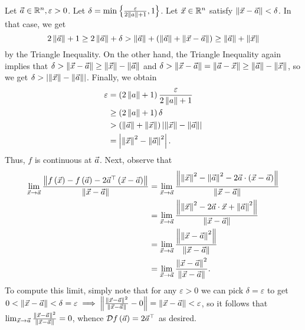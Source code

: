 \documentclass[main.tex]{subfiles}
\begin{document}
\begin{soln}
    Let $\va\in \RR^n, \varepsilon > 0$. Let $\delta = \min\braces{\frac{\varepsilon}{2\norm{a} + 1}, 1}$. Let $\vx\in \RR^n$ satisfy $\norm{\vx -\va} < \delta$. In that case, we get
    \[2\norm{\va} + 1 \ge 2\norm{\va} + \delta > \norm{\va} + \parens{\norm{\va} + \norm{\vx - \va}} \ge \norm{\va} + \norm{\vx}\]
    by the Triangle Inequality. On the other hand, the Triangle Inequality again implies that $\delta > \norm{\vx - \va} \ge \norm{\vx} - \norm{\va}$ and $\delta > \norm{\vx - \va} = \norm{\va - \vx} \ge \norm{\va} - \norm{\vx}$, so we get $\delta > \abs{\norm{\vx} - \norm{\va}}$. Finally, we obtain
    \begin{align*}
        \varepsilon &= \parens{2\norm{a} + 1}\frac{\varepsilon}{2\norm{a} + 1} \\
        &\ge \parens{2\norm{a} + 1}\delta \\
        &> \parens{\norm{\va} + \norm{\vx}}\abs{\norm{\vx} - \norm{\va}} \\
        &= \abs{\norm{\vx}^2 - \norm{\va}^2}.
    \end{align*}
    Thus, $f$ is continuous at $\va$.  Next, observe that
    \begin{align*}
        \limv{a} \frac{\norm{f\parens{\vx} - f\parens{\vec{a}} - 2\va^\top\parens{\vx - \vec{a}}}}{\norm{\vec{x} - \vec{a}}} &= \limv{a} \frac{\norm{\norm{\vx}^2 - \norm{\va}^2 - 2\va \cdot \parens{\vx - \va}}}{\norm{\vec{x} - \vec{a}}} \\
        &= \limv{a} \frac{\norm{\norm{\vx}^2 - 2\va\cdot \vx + \norm{\va}^2}}{\norm{\vx - \va}} \\
        &= \limv{a} \frac{\norm{\norm{\vx - \va}^2}}{\norm{\vx - \va}} \\
        &= \limv{a} \frac{\norm{\vx - \va}^2}{\norm{\vx - \va}}.
    \end{align*}
    To compute this limit, simply note that for any $\varepsilon > 0$ we can pick $\delta = \varepsilon$ to get $0 < \norm{\vx - \va} < \delta = \varepsilon \implies \norm{\frac{\norm{\vx - \va}^2}{\norm{\vx - \va}} - 0} = \norm{\vx - \va} < \varepsilon$, so it follows that $\limv{a} \frac{\norm{\vx - \va}^2}{\norm{\vx - \va}} = 0$, whence $\mathcal{D}f\parens{\va} = 2\va^\top$ as desired.
\end{soln}
\eject
\end{document}

